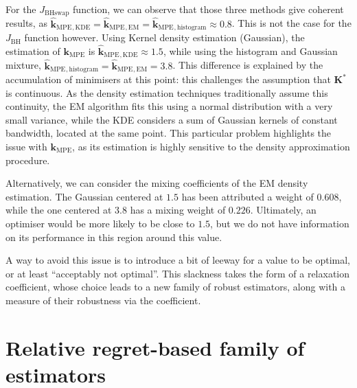 \documentclass[preprint, 1p]{elsarticle}
\newcommand{\kmpe}{{\mathbf{k}}_{\mathrm{MPE}}}
\newcommand{\hatkmpe}{\hat{\mathbf{k}}_{\mathrm{MPE}}}
\newcommand{\elise}[1]{{\itshape\color{red} ({#1})}}
\begin{document}
For the $J_{\mathrm{BHswap}}$ function, we can observe that those three methods give coherent results, as $\hatkmpe {}_{,\mathrm{KDE}} =\hatkmpe {}_{,\mathrm{EM}}=\hatkmpe {}_{,\mathrm{histogram}}\approx 0.8$. This is not the case for the  $J_{\mathrm{BH}}$ function however. Using Kernel density estimation (Gaussian), the estimation of $\kmpe$ is $\hatkmpe {}_{,\mathrm{KDE}} \approx 1.5$, while using the histogram and Gaussian mixture, $\hatkmpe {}_{,\mathrm{histogram}}=\hatkmpe {}_{,\mathrm{EM}}=3.8$.
This difference is explained by the accumulation of minimisers at this point: this challenges the assumption that $\mathbf{K}^*$ is continuous. As the density estimation techniques traditionally assume this continuity, the EM algorithm fits this using a normal distribution with a very small variance, while the KDE considers a sum of Gaussian kernels of constant bandwidth, located at the same point. This particular problem highlights the issue with $\kmpe$, as its estimation is highly sensitive to the density approximation procedure.

Alternatively, we can consider the mixing coefficients of the EM
density estimation. The Gaussian centered at $1.5$ has been attributed
a weight of $0.608$, while the one centered at $3.8$ has a mixing
weight of $0.226$. Ultimately, an optimiser would be more likely to be
close to $1.5$, but we do not have information on its performance in
this region around this value.

A way to avoid this issue is to introduce a bit of leeway for a value to be optimal, or at least ``acceptably not optimal''. This slackness takes the form of a relaxation coefficient, whose choice leads to a new family of robust estimators, along with a measure of their robustness via the coefficient.





\section{Relative regret-based family of estimators}%
\label{sec:relax_constraint}
\end{document}

